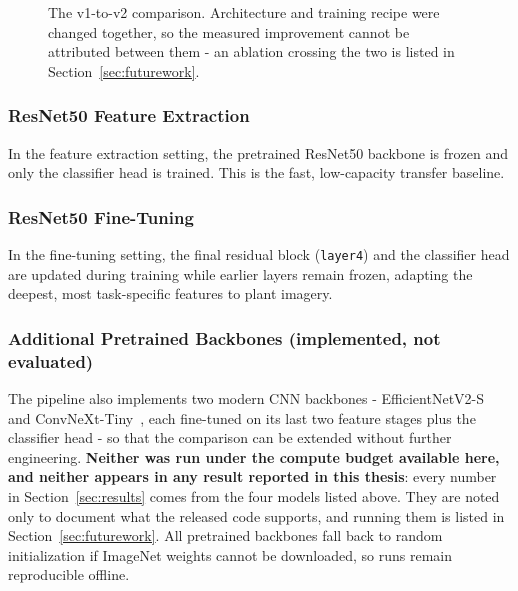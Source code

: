 \documentclass[12pt,a4paper]{article}
\begin{document}
\begin{figure}[H]
    \caption{The v1-to-v2 comparison. Architecture and training recipe were changed together, so the measured improvement cannot be attributed between them - an ablation crossing the two is listed in Section~\ref{sec:futurework}.}
    \label{fig:v1v2diff}
\end{figure}

\subsubsection{ResNet50 Feature Extraction}
In the feature extraction setting, the pretrained ResNet50 backbone is frozen and only the classifier head is trained. This is the fast, low-capacity transfer baseline.

\subsubsection{ResNet50 Fine-Tuning}
In the fine-tuning setting, the final residual block (\texttt{layer4}) and the classifier head are updated during training while earlier layers remain frozen, adapting the deepest, most task-specific features to plant imagery.

\subsubsection{Additional Pretrained Backbones (implemented, not evaluated)}
The pipeline also implements two modern CNN backbones - EfficientNetV2-S~\cite{tan2021} and ConvNeXt-Tiny~\cite{liu2022}, each fine-tuned on its last two feature stages plus the classifier head - so that the comparison can be extended without further engineering. \textbf{Neither was run under the compute budget available here, and neither appears in any result reported in this thesis}: every number in Section~\ref{sec:results} comes from the four models listed above. They are noted only to document what the released code supports, and running them is listed in Section~\ref{sec:futurework}. All pretrained backbones fall back to random initialization if ImageNet weights cannot be downloaded, so runs remain reproducible offline.
\end{document}
